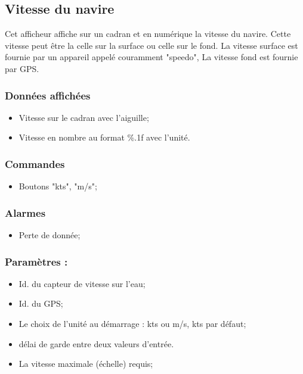 \documentclass[a4paper,11pt]{report}
\begin{document}
\subsection{Vitesse du navire}

Cet afficheur affiche sur un cadran et en numérique la vitesse du navire.
Cette vitesse peut être la celle sur la surface ou celle sur le fond.
La vitesse surface est fournie par un appareil appelé couramment "speedo",
La vitesse fond est fournie par GPS.


\subsubsection{Données affichées}
\begin{itemize}
	\item Vitesse sur le cadran avec l'aiguille;
	\item Vitesse en nombre au format \%.1f avec l'unité.
\end{itemize}

\subsubsection{Commandes}
\begin{itemize}
	\item Boutons "kts", "m/s";
\end{itemize}

\subsubsection{Alarmes}
\begin{itemize}
	\item Perte de donnée;
\end{itemize}

\subsubsection{ Paramètres :}
\begin{itemize}
	\item Id. du capteur de vitesse sur l'eau;
	\item Id. du GPS;
	\item Le choix de l'unité au démarrage : kts ou m/s, kts par défaut;
	\item délai de garde entre deux valeurs d'entrée.
    \item La vitesse maximale (échelle) requis;
\end{itemize}
\end{document}
